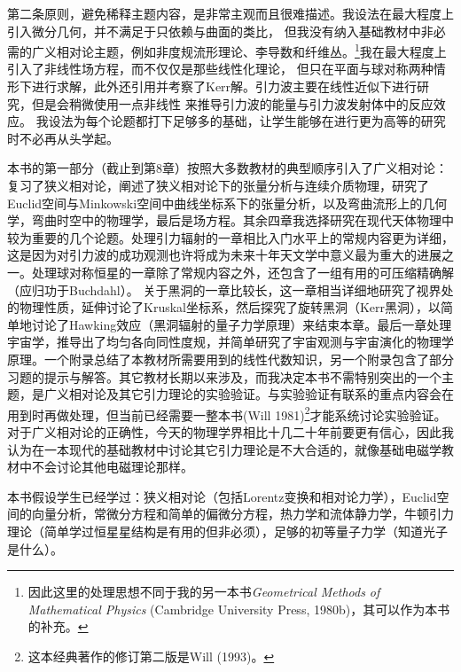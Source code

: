 第二条原则，避免稀释主题内容，是非常主观而且很难描述。我设法在最大程度上引入微分几何，并不满足于只依赖与曲面的类比，%
但我没有纳入基础教材中非必需的广义相对论主题，例如非度规流形理论、李导数和纤维丛。\footnote{因此这里的处理思想不同于我的另一本书\textit{Geometrical Methods of Mathematical Physics} (Cambridge University Press, 1980b)，其可以作为本书的补充。}我在最大程度上引入了非线性场方程，而不仅仅是那些线性化理论，%
但只在平面与球对称两种情形下进行求解，此外还引用并考察了Kerr解。引力波主要在线性近似下进行研究，但是会稍微使用一点非线性%
来推导引力波的能量与引力波发射体中的反应效应。%
我设法为每个论题都打下足够多的基础，让学生能够在进行更为高等的研究时不必再从头学起。

本书的第一部分（截止到第8章）按照大多数教材的典型顺序引入了广义相对论：复习了狭义相对论，阐述了狭义相对论下的张量分析与连续介质物理，研究了Euclid空间与Minkowski空间中曲线坐标系下的张量分析，以及弯曲流形上的几何学，弯曲时空中的物理学，最后是场方程。其余四章我选择研究在现代天体物理中较为重要的几个论题。处理引力辐射的一章相比入门水平上的常规内容更为详细，这是因为对引力波的成功观测也许将成为未来十年天文学中意义最为重大的进展之一。处理球对称恒星的一章除了常规内容之外，还包含了一组有用的可压缩精确解（应归功于Buchdahl）。%
关于黑洞的一章比较长，这一章相当详细地研究了视界处的物理性质，延伸讨论了Kruskal坐标系，然后探究了旋转黑洞（Kerr黑洞），以简单地讨论了Hawking效应（黑洞辐射的量子力学原理）来结束本章。最后一章处理宇宙学，推导出了均匀各向同性度规，并简单研究了宇宙观测与宇宙演化的物理学原理。一个附录总结了本教材所需要用到的线性代数知识，另一个附录包含了部分习题的提示与解答。其它教材长期以来涉及，而我决定本书不需特别突出的一个主题，是广义相对论及其它引力理论的实验验证。与实验验证有联系的重点内容会在用到时再做处理，但当前已经需要一整本书(Will 1981)\footnote{这本经典著作的修订第二版是Will (1993)。}才能系统讨论实验验证。对于广义相对论的正确性，今天的物理学界相比十几二十年前要更有信心，因此我认为在一本现代的基础教材中讨论其它引力理论是不大合适的，就像基础电磁学教材中不会讨论其他电磁理论那样。

本书假设学生已经学过：狭义相对论（包括Lorentz变换和相对论力学），Euclid空间的向量分析，常微分方程和简单的偏微分方程，热力学和流体静力学，牛顿引力理论（简单学过恒星星结构是有用的但非必须），足够的初等量子力学（知道光子是什么）。

